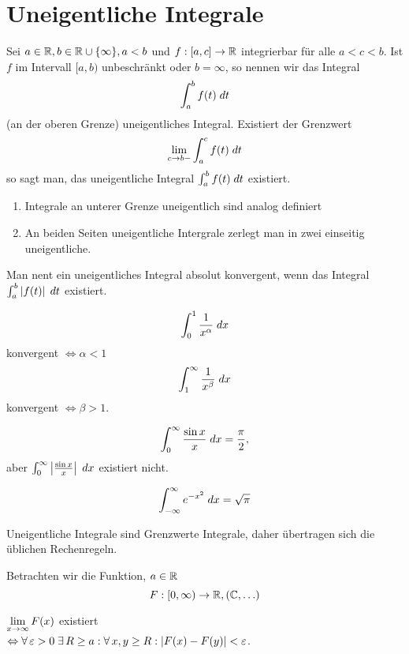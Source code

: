 \documentclass[../ana2u.tex]{subfiles}
\begin{document}
\setcounter{section}{4}
\section{Uneigentliche Integrale}
\begin{defi}
    Sei \( a \in \R, b \in \R \cup \set{\infty}, a < b \) 
    und \( \abb{f}{[a,c]}{\R} \)
    integrierbar für alle \( a < c < b \).
    Ist \(f\) im Intervall \( [a,b) \) unbeschränkt 
    oder \( b = \infty \), so nennen wir das Integral
    \[ \integralx{f(t)}{a}{b}{t} \]
    (an der oberen Grenze) uneigentliches Integral.
    Existiert der Grenzwert
    \[ \limesx{c}{b-} \integralx{f(t)}{a}{c}{t} \]
    so sagt man, das uneigentliche Integral
    \( \integralx{f(t)}{a}{b}{t} \) existiert.
\end{defi}
\begin{bem}\leavevmode
    \begin{enumerate}
        \item Integrale an unterer Grenze uneigentlich sind 
        analog definiert
        \item An beiden Seiten uneigentliche Intergrale 
        zerlegt man in zwei einseitig uneigentliche.
    \end{enumerate}
\end{bem}
Man nent ein uneigentliches Integral absolut konvergent, 
wenn das Integral \( \integralx{\abs{f(t)}}{a}{b}{t} \)
existiert.
\begin{bsp}
    \[ \integral{\frac{1}{x^\alpha}}{0}{1} \] konvergent 
    \( \Leftrightarrow \alpha < 1 \)
    \[ \integral{\frac{1}{x^\beta}}{1}{\infty} \]
    konvergent \( \Leftrightarrow \beta > 1 \).
\end{bsp}
\begin{bsp}
    \[ \integral{\frac{\sin x}{x}}{0}{\infty} = \frac{\pi}{2}, \]
    aber \( \integral{\abs{\frac{\sin x}{x}}}{0}{\infty} \)
    existiert nicht.
\end{bsp}
\begin{bsp}
    \[ \integral{e^{-x^2}}{-\infty}{\infty} = \sqrt{\pi} \]
\end{bsp}
\begin{bem}
    Uneigentliche Integrale sind Grenzwerte 
     Integrale, daher übertragen 
    sich die üblichen Rechenregeln.  
\end{bem}
Betrachten wir die Funktion, \(a \in \R\) 
\[ \abb{F}{[0,\infty)}{\R}, (\C, \ldots) \]
\begin{beh}
    \( \limes{x} F(x) \) existiert \\
    \( \Leftrightarrow 
    \forall \varepsilon > 0 \;\exists R \geq a : 
    \forall x,y \geq R: \abs{F(x) - F(y)} < \varepsilon \).
\end{beh}
\end{document}
